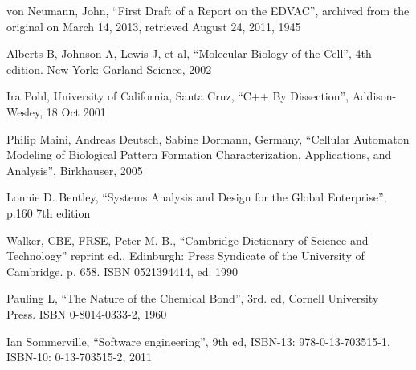 \begin{thebibliography}{}
 von Neumann, John, 
``First Draft of a Report on the EDVAC'', 
archived from the original on March 14, 2013, retrieved August 24, 2011, 1945

 Alberts B, Johnson A, Lewis J, et al, 
``Molecular Biology of the Cell'', 
4th edition. New York: Garland Science, 2002

 Ira Pohl, University of California, Santa Cruz, 
``C++ By Dissection'', Addison-Wesley,   18 Oct 2001

 Philip Maini, Andreas Deutsch, Sabine Dormann, Germany,
``Cellular Automaton Modeling of Biological Pattern Formation Characterization, Applications, and Analysis'',  
Birkhauser, 2005

 Lonnie D. Bentley, 
``Systems Analysis and Design for the Global Enterprise'', 
 p.160 7th edition

 Walker, CBE, FRSE, Peter M. B.,
``Cambridge Dictionary of Science and Technology'' reprint ed., 
Edinburgh: Press Syndicate of the University of Cambridge. p. 658. ISBN 0521394414, ed. 1990

 Pauling L, 
``The Nature of the Chemical Bond'', 3rd. ed, 
Cornell University Press. ISBN 0-8014-0333-2, 1960 

 Ian Sommerville, 
``Software engineering'', 9th ed, ISBN-13: 978-0-13-703515-1, ISBN-10: 0-13-703515-2, 2011

\end{thebibliography}

